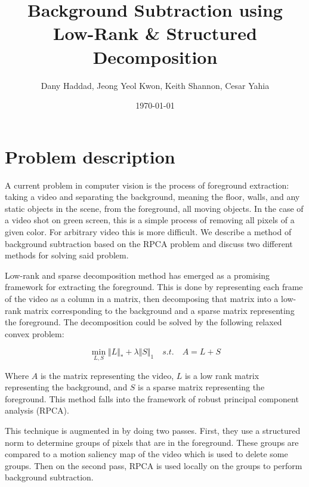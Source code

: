 \documentclass[a4paper]{article}
\title{Background Subtraction using Low-Rank \& Structured Decomposition}
\author{Dany Haddad, Jeong Yeol Kwon, Keith Shannon, Cesar Yahia}
\date{\today}
\begin{document}
\maketitle


\vspace{-3pt}
\section{Problem description}
\label{sec:introduction}
A current problem in computer vision is the process of foreground extraction: taking a video
and separating the background, meaning the floor, walls, and any static objects in the scene,
from the foreground, all moving objects. In the case of a video shot on green screen, this is a
simple process of removing all pixels of a given color. For arbitrary video this is more difficult.
We describe a method of background subtraction based on the RPCA problem and discuss two
different methods for solving said problem. \newline

Low-rank and sparse decomposition method has emerged as a promising framework for extracting the foreground. This is done by representing each frame of the video as a column in a matrix, then decomposing that matrix into a low-rank matrix corresponding to the background and a sparse matrix representing the foreground. The decomposition could be solved by the following relaxed convex problem: \newline

\begin{equation}\label{bound}
\min_{L,S} \Vert L \Vert_{\ast} + \lambda \Vert S \Vert_{1} \quad s.t. \quad A=L+S
\end{equation}

Where $A$ is the matrix representing the video, $L$ is a low rank matrix representing the background, and $S$ is a sparse matrix representing the foreground. This method falls into the framework of robust principal component analysis (RPCA). \newline

This technique is augmented in \cite{xin_liu_background_2015} by doing two passes. First, they use a structured norm to determine groups of pixels that are in the foreground. These groups are compared to a motion saliency map of the video which is used to delete some groups. Then on the second pass, RPCA is used locally on the groups to perform background subtraction. \newline
\end{document}
